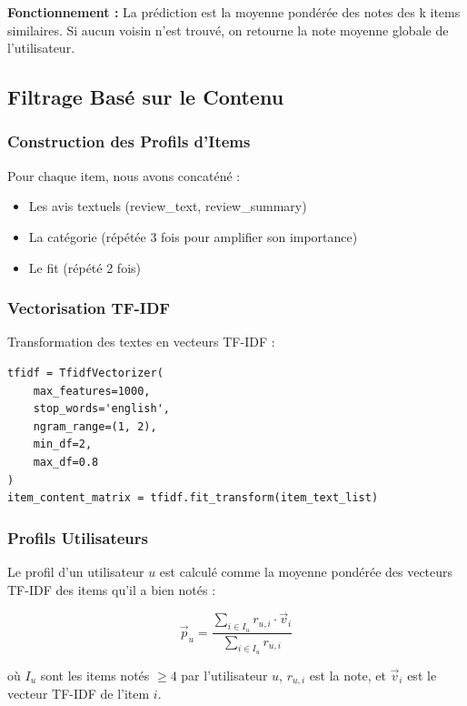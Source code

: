 \documentclass[12pt,a4paper]{article}
\begin{document}
\textbf{Fonctionnement :} La prédiction est la moyenne pondérée des notes des k items similaires. Si aucun voisin n'est trouvé, on retourne la note moyenne globale de l'utilisateur.

\subsection{Filtrage Basé sur le Contenu}

\subsubsection{Construction des Profils d'Items}

Pour chaque item, nous avons concaténé :
\begin{itemize}
    \item Les avis textuels (review\_text, review\_summary)
    \item La catégorie (répétée 3 fois pour amplifier son importance)
    \item Le fit (répété 2 fois)
\end{itemize}

\subsubsection{Vectorisation TF-IDF}

Transformation des textes en vecteurs TF-IDF :
\begin{lstlisting}
tfidf = TfidfVectorizer(
    max_features=1000,
    stop_words='english',
    ngram_range=(1, 2),
    min_df=2,
    max_df=0.8
)
item_content_matrix = tfidf.fit_transform(item_text_list)
\end{lstlisting}

\subsubsection{Profils Utilisateurs}

Le profil d'un utilisateur $u$ est calculé comme la moyenne pondérée des vecteurs TF-IDF des items qu'il a bien notés :

\begin{equation}
\vec{p}_u = \frac{\sum_{i \in I_u} r_{u,i} \cdot \vec{v}_i}{\sum_{i \in I_u} r_{u,i}}
\end{equation}

où $I_u$ sont les items notés $\geq 4$ par l'utilisateur $u$, $r_{u,i}$ est la note, et $\vec{v}_i$ est le vecteur TF-IDF de l'item $i$.
\end{document}
